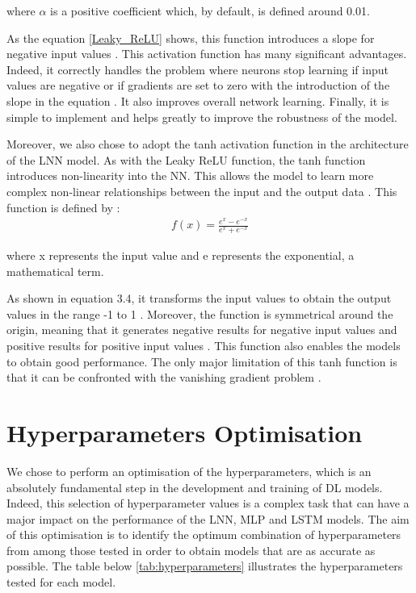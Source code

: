 \documentclass[12pt,oneside]{book} %
\begin{document}
\noindent where \(\alpha\) is a positive coefficient which, by default, is defined around 0.01.

\noindent As the equation \ref{Leaky_ReLU} shows, this function introduces a slope for negative input values \cite{leaky_relu}. This activation function has many significant advantages. Indeed, it correctly handles the problem where neurons stop learning if input values are negative or if gradients are set to zero with the introduction of the slope in the equation \cite{leaky_relu}. It also improves overall network learning. Finally, it is simple to implement and helps greatly to improve the robustness of the model.

\noindent Moreover, we also chose to adopt the tanh activation function in the architecture of the LNN model. As with the Leaky ReLU function, the tanh function introduces non-linearity into the NN. This allows the model to learn more complex non-linear relationships between the input and the output data \cite{Tanh3}. This function is defined by \citep{Tanh1,Tanh3}: 
\begin{align}
f(x) = \frac{e^x - e^{-x}}{e^x + e^{-x}}
\label{tanh}
\end{align}

\noindent where x represents the input value and e represents the exponential, a mathematical term.

\noindent As shown in equation 3.4, it transforms the input values to obtain the output values in the range -1 to 1 \citep{Tanh1,Tanh3}. Moreover, the function is symmetrical around the origin, meaning that it generates negative results for negative input values and positive results for positive input values \cite{Tanh3}. This function also enables the models to obtain good performance. The only major limitation of this tanh function is that it can be confronted with the vanishing gradient problem \citep{Tanh1,Tanh3}.

\section{Hyperparameters Optimisation}
\label{hyperparameters_optimisation}

\noindent We chose to perform an optimisation of the hyperparameters, which is an absolutely fundamental step in the development and training of DL models. Indeed, this selection of hyperparameter values is a complex task that can have a major impact on the performance of the LNN, MLP and LSTM models. The aim of this optimisation is to identify the optimum combination of hyperparameters from among those tested in order to obtain models that are as accurate as possible. The table below \ref{tab:hyperparameters} illustrates the hyperparameters tested for each model.
\end{document}

